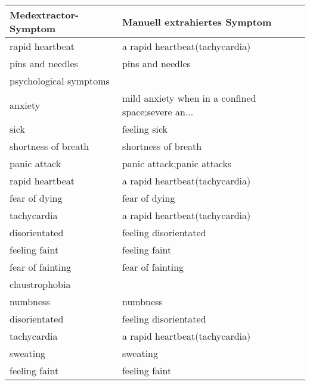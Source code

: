 \begin{table}[H]
\begin{center}
\begin{tabular}{ll}
\toprule
  Medextractor-Symptom &                       Manuell extrahiertes Symptom \\
\midrule
                    rapid heartbeat &                     a rapid heartbeat(tachycardia) \\
      pins and needles &                                   pins and needles \\

psychological symptoms &                                                    \\
               anxiety & mild anxiety when in a confined space;severe an... \\
                  sick &                                       feeling sick \\
   shortness of breath &                                shortness of breath \\
          panic attack &                         panic attack;panic attacks \\
       rapid heartbeat &                     a rapid heartbeat(tachycardia) \\
         fear of dying &                                      fear of dying \\
           tachycardia &                     a rapid heartbeat(tachycardia) \\
         disorientated &                              feeling disorientated \\
         feeling faint &                                      feeling faint \\
      fear of fainting &                                   fear of fainting \\
        claustrophobia &                                                    \\
              numbness &                                           numbness \\
         disorientated &                              feeling disorientated \\
           tachycardia &                     a rapid heartbeat(tachycardia) \\
              sweating &                                           sweating \\
         feeling faint &                                      feeling faint \\

\end{tabular}
\end{center}
\end{table}

